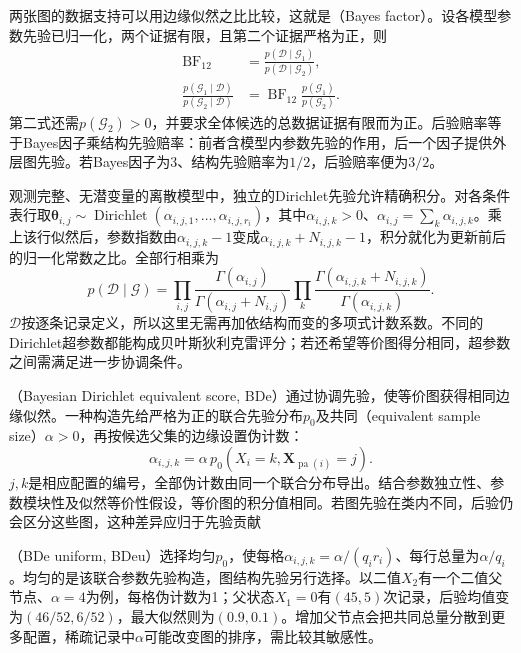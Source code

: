 两张图的数据支持可以用边缘似然之比比较，这就是（Bayes factor）。设各模型参数先验已归一化，两个证据有限，且第二个证据严格为正，则
\begin{equation}
  \begin{aligned}
    \operatorname{BF}_{12}
      &=\frac{p(\mathcal{D}\mid\mathcal{G}_1)}
              {p(\mathcal{D}\mid\mathcal{G}_2)},\\
    \frac{p(\mathcal{G}_1\mid\mathcal{D})}
         {p(\mathcal{G}_2\mid\mathcal{D})}
      &=\operatorname{BF}_{12}
        \frac{p(\mathcal{G}_1)}{p(\mathcal{G}_2)}.
  \end{aligned}
  \label{eq:pgm-structure-learning-bayes-factor}
\end{equation}
第二式还需$p(\mathcal{G}_2)>0$，并要求全体候选的总数据证据有限而为正。后验赔率等于Bayes因子乘结构先验赔率：前者含模型内参数先验的作用，后一个因子提供外层图先验。若Bayes因子为$3$、结构先验赔率为$1/2$，后验赔率便为$3/2$。

观测完整、无潜变量的离散模型中，独立的Dirichlet先验允许精确积分。对各条件表行取$\bm{\theta}_{i,j}\sim\operatorname{Dirichlet}(\alpha_{i,j,1},\ldots,\alpha_{i,j,r_i})$，其中$\alpha_{i,j,k}>0$、$\alpha_{i,j}=\sum_k\alpha_{i,j,k}$。乘上该行似然后，参数指数由$\alpha_{i,j,k}-1$变成$\alpha_{i,j,k}+N_{i,j,k}-1$，积分就化为更新前后的归一化常数之比。全部行相乘为
\begin{equation}
  p(\mathcal{D}\mid\mathcal{G})
  =\prod_{i,j}
    \frac{\Gamma(\alpha_{i,j})}
         {\Gamma(\alpha_{i,j}+N_{i,j})}
    \prod_k
    \frac{\Gamma(\alpha_{i,j,k}+N_{i,j,k})}
         {\Gamma(\alpha_{i,j,k})}.
  \label{eq:pgm-structure-learning-dirichlet}
\end{equation}
$\mathcal{D}$按逐条记录定义，所以这里无需再加依结构而变的多项式计数系数。不同的Dirichlet超参数都能构成贝叶斯狄利克雷评分；若还希望等价图得分相同，超参数之间需满足进一步协调条件。

（Bayesian Dirichlet equivalent score, BDe）通过协调先验，使等价图获得相同边缘似然。一种构造先给严格为正的联合先验分布$p_0$及共同（equivalent sample size）$\alpha>0$，再按候选父集的边缘设置伪计数：
\[
  \alpha_{i,j,k}
  =\alpha\,p_0(X_i=k,\bm{X}_{\operatorname{pa}(i)}=j).
\]
$j,k$是相应配置的编号，全部伪计数由同一个联合分布导出。结合参数独立性、参数模块性及似然等价性假设，等价图的积分值相同。若图先验在类内不同，后验仍会区分这些图，这种差异应归于先验贡献

（BDe uniform, BDeu）选择均匀$p_0$，使每格$\alpha_{i,j,k}=\alpha/(q_i r_i)$、每行总量为$\alpha/q_i$。均匀的是该联合参数先验构造，图结构先验另行选择。以二值$X_2$有一个二值父节点、$\alpha=4$为例，每格伪计数为1；父状态$X_1=0$有$(45,5)$次记录，后验均值变为$(46/52,6/52)$，最大似然则为$(0.9,0.1)$。增加父节点会把共同总量分散到更多配置，稀疏记录中$\alpha$可能改变图的排序，需比较其敏感性。

